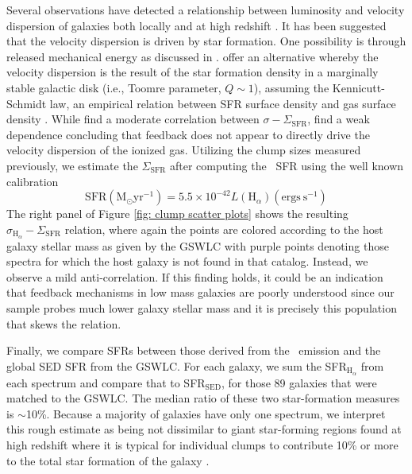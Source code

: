Several observations have detected a relationship between luminosity and velocity dispersion of galaxies both locally and at high redshift \citep{Dib2006,Green2010,Lehnert2009,Genzel2011}. It has been suggested that the velocity dispersion is driven by star formation. One possibility is through released mechanical energy as discussed in \cite{Lehnert2009}. \cite{Wisnioski2012} offer an alternative whereby the velocity dispersion is the result of the star formation density in a marginally stable galactic disk (i.e., Toomre parameter, $Q\sim1$), assuming the Kennicutt-Schmidt law, an empirical relation between SFR surface density and gas surface density \citep{Schmidt1959,Kennicutt1998a}. While \cite{Wisnioski2012} find a moderate correlation between $\sigma-\Sigma_{\mathrm{SFR}}$, \cite{Genzel2011} find a weak dependence concluding that feedback does not appear to directly drive the velocity dispersion of the ionized gas.  Utilizing the clump sizes measured previously, we estimate the $\Sigma_{\mathrm{SFR}}$ after computing the \ha~SFR using the well known calibration \citep{Kennicutt1998,Calzetti2013}
\begin{equation}
\mathrm{SFR} (\mathrm{M}_{\odot} \mathrm{yr}^{-1}) = 5.5 \times 10^{-42}L(\mathrm{H}_{\alpha}) (\mathrm{ergs\ s}^{-1})
\end{equation}
The right panel of Figure \ref{fig: clump scatter plots} shows the resulting $\sigma_{\mathrm{H}_{\alpha}}-\Sigma_{\mathrm{SFR}}$ relation, where again the points are colored according to the host galaxy stellar mass as given by the GSWLC with purple points denoting those spectra for which the host galaxy is not found in that catalog. Instead, we observe a mild anti-correlation. If this finding holds, it could be an indication that feedback mechanisms in low mass galaxies are poorly understood since our sample probes much lower galaxy stellar mass and it is precisely this population that skews the relation. 


Finally, we compare SFRs between those derived from the \ha~emission and the global SED SFR from the GSWLC. For each galaxy, we sum the SFR$_{\mathrm{H}_{\alpha}}$ from each spectrum and compare that to SFR$_{\mathrm{SED}}$, for those 89 galaxies that were matched to the GSWLC. The median ratio of these two star-formation measures is $\sim$10\%. Because a majority of galaxies have only one spectrum, we interpret this rough estimate as being not dissimilar to giant star-forming regions found at high redshift where it is typical for individual clumps to contribute 10\% or more to the total star formation of the galaxy \citep{Genzel2011, Guo2012, Wisnioski2012}.


